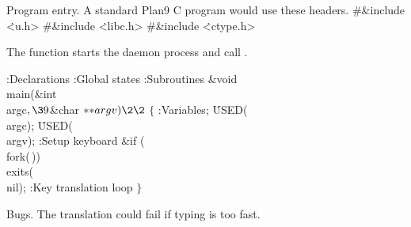 Program entry. A standard Plan9 C program would use these headers.
\Y\B\8\#\&{include} \.{<u.h>}\6
\8\#\&{include} \.{<libc.h>}\6
\8\#\&{include} \.{<ctype.h>}\par
\fi

The  function starts the daemon process and call .

\Y\B{}:Declarations\X\6
:Global states\X\6
:Subroutines\X\7
\1\1\&{void} \\{main}(\&{int} \\{argc}${},\39{}$\&{char} ${}{*}{*}\\{argv})\2%
\2{}$\6
${}\{{}$\1\6
:Variables\X;\6
\.{USED}(\\{argc});\6
\.{USED}(\\{argv});\6
:Setup keyboard\X\6
\&{if} (\\{fork}(\,))\1\5
\\{exits}(\\{nil});\2\6
:Key translation loop\X\6
\4${}\}{}$\2\par
\fi

Bugs. The translation could fail if typing is too fast.
\fi

\inx
\fin
\con
